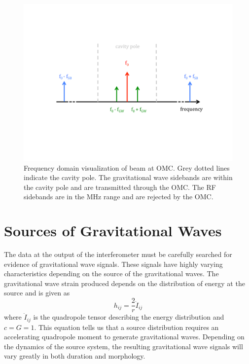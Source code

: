 \begin{figure}[ht!]
\includegraphics[width=\textwidth]{figures/introduction/omc-freq}
\caption[Sidebands and OMC cavity pole]{Frequency domain visualization of beam %
         at OMC. Grey dotted lines indicate the cavity pole. The gravitational %
         wave sidebands are within the cavity pole and are transmitted through %
         the OMC. The RF sidebands are in the MHz range and are rejected by the %
         OMC.}
\label{fig:omc-freq}
\end{figure}

\section{Sources of Gravitational Waves}

The data at the output of the interferometer must be carefully searched 
for evidence of gravitational wave signals. These signals have highly 
varying characteristics depending on the source of the gravitational 
waves. The gravitational wave strain produced depends on the distribution 
of energy at the source and is given as
\begin{equation}
h_{ij} = \frac{2}{r}\ddot{I}_{ij}
\end{equation}
where $\ddot{I}_{ij}$ is the quadropole tensor describing the 
energy distribution and $c=G=1$. This equation tells us that 
a source distribution requires an accelerating quadropole moment to 
generate gravitational waves. Depending on the dynamics of the source 
system, the resulting gravitational wave signals will vary greatly in 
both duration and morphology.

